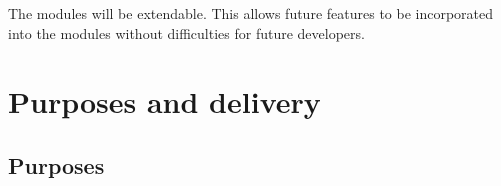 The modules will be extendable.
This allows future features to be incorporated into the modules without difficulties for future developers.






\section{Purposes and delivery}
\subsection{Purposes}

